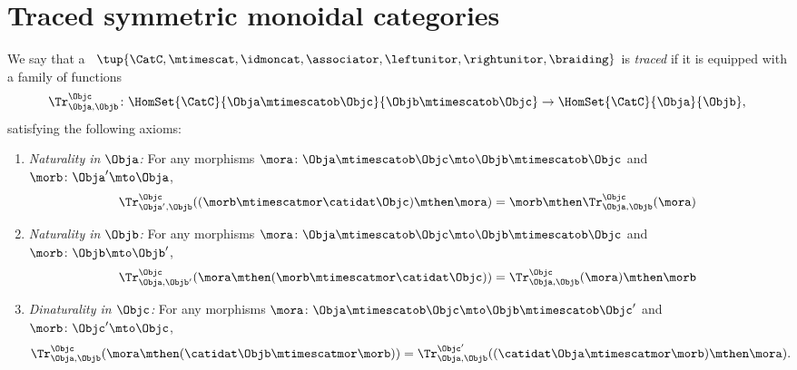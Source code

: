 
\section{Traced symmetric monoidal categories}


\begin{ctdefinition}
    \label{def:traced-monoidal-cat}
    \label{def:traced-monoidal-category}
    We say that a ~$\tup{\CatC, \mtimescat, \idmoncat, \associator, \leftunitor, \rightunitor, \braiding}$ is \emph{traced} if it is equipped with a family of functions
    \begin{equation}
        \Tr_{\Obja,\Objb}^\Objc\colon \HomSet{\CatC}{\Obja \mtimescatob \Objc}{\Objb\mtimescatob \Objc}\to \HomSet{\CatC}{\Obja}{\Objb},
    \end{equation}
    satisfying the following axioms:
    \begin{enumerate}
        \item \emph{Naturality in $\Obja$:} For any morphisms $\mora\colon \Obja\mtimescatob \Objc \mto \Objb\mtimescatob \Objc$ and $\morb \colon \Obja' \mto \Obja$,
              \begin{equation}\label{eq:trace-naturality-1}
                  \Tr_{\Obja', \Objb}^\Objc ( (\morb \mtimescatmor \catidat\Objc) \mthen \mora) = \morb \mthen \Tr_{\Obja, \Objb}^\Objc (\mora)
              \end{equation}
        \item \emph{Naturality in $\Objb$:} For any morphisms $\mora\colon \Obja\mtimescatob \Objc \mto \Objb\mtimescatob \Objc$ and $\morb \colon \Objb \mto \Objb'$,
              \begin{equation}\label{eq:trace-naturality-2}
                  \Tr_{\Obja, \Objb'}^\Objc ( \mora \mthen (\morb \mtimescatmor \catidat\Objc) ) = \Tr_{\Obja, \Objb}^\Objc (\mora) \mthen \morb
              \end{equation}
        \item \emph{Dinaturality in $\Objc$:}
              For any morphisms $\mora \colon \Obja  \mtimescatob \Objc \mto \Objb \mtimescatob \Objc'$ and $\morb \colon \Objc' \mto \Objc$,
              \begin{equation}\label{eq:trace-dinaturality}
                  \Tr_{\Obja, \Objb}^{\Objc} (\mora \mthen (\catidat\Objb \mtimescatmor \morb)) = \Tr_{\Obja, \Objb}^{\Objc'}((\catidat\Obja \mtimescatmor \morb) \mthen \mora).
              \end{equation}


\end{enumerate}
\end{ctdefinition}
